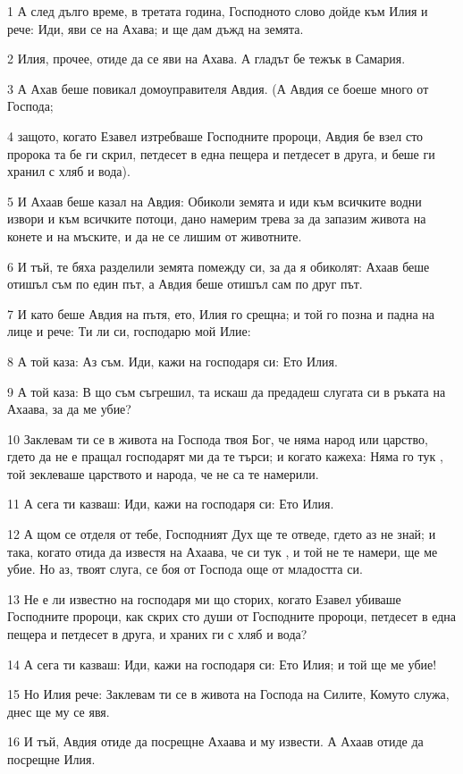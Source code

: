 \par 1 А след дълго време, в третата година, Господното слово дойде към Илия и рече: Иди, яви се на Ахава; и ще дам дъжд на земята.
\par 2 Илия, прочее, отиде да се яви на Ахава. А гладът бе тежък в Самария.
\par 3 А Ахав беше повикал домоуправителя Авдия. (А Авдия се боеше много от Господа;
\par 4 защото, когато Езавел изтребваше Господните пророци, Авдия бе взел сто пророка та бе ги скрил, петдесет в една пещера и петдесет в друга, и беше ги хранил с хляб и вода).
\par 5 И Ахаав беше казал на Авдия: Обиколи земята и иди към всичките водни извори и към всичките потоци, дано намерим трева за да запазим живота на конете и на мъските, и да не се лишим от животните.
\par 6 И тъй, те бяха разделили земята помежду си, за да я обиколят: Ахаав беше отишъл съм по един път, а Авдия беше отишъл сам по друг път.
\par 7 И като беше Авдия на пътя, ето, Илия го срещна; и той го позна и падна на лице и рече: Ти ли си, господарю мой Илие:
\par 8 А той каза: Аз съм. Иди, кажи на господаря си: Ето Илия.
\par 9 А той каза: В що съм съгрешил, та искаш да предадеш слугата си в ръката на Ахаава, за да ме убие?
\par 10 Заклевам ти се в живота на Господа твоя Бог, че няма народ или царство, гдето да не е пращал господарят ми да те търси; и когато кажеха: Няма го тук , той зеклеваше царството и народа, че не са те намерили.
\par 11 А сега ти казваш: Иди, кажи на господаря си: Ето Илия.
\par 12 А щом се отделя от тебе, Господният Дух ще те отведе, гдето аз не знай; и така, когато отида да известя на Ахаава, че си тук , и той не те намери, ще ме убие. Но аз, твоят слуга, се боя от Господа още от младостта си.
\par 13 Не е ли известно на господаря ми що сторих, когато Езавел убиваше Господните пророци, как скрих сто души от Господните пророци, петдесет в една пещера и петдесет в друга, и храних ги с хляб и вода?
\par 14 А сега ти казваш: Иди, кажи на господаря си: Ето Илия; и той ще ме убие!
\par 15 Но Илия рече: Заклевам ти се в живота на Господа на Силите, Комуто служа, днес ще му се явя.
\par 16 И тъй, Авдия отиде да посрещне Ахаава и му извести. А Ахаав отиде да посрещне Илия.
